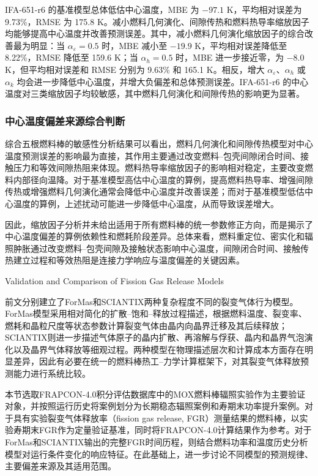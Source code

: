IFA-651-r6 的基准模型总体低估中心温度，MBE 为 \(-97.1\) K，平均相对误差为 9.73\%，RMSE 为 175.8 K。减小燃料几何演化、间隙传热和燃料热导率缩放因子均能够提高中心温度并改善预测误差。其中，减小燃料几何演化缩放因子的综合改善最为明显：当 \(\alpha_{\varepsilon}=0.5\) 时，MBE 减小至 \(-19.9\) K，平均相对误差降低至 8.22\%，RMSE 降低至 159.6 K；当 \(\alpha_h=0.5\) 时，MBE 进一步接近零，为 \(-8.0\) K，但平均相对误差和 RMSE 分别为 9.63\% 和 165.1 K。相反，增大 \(\alpha_{\varepsilon}\)、\(\alpha_h\) 或 \(\alpha_k\) 均会进一步降低中心温度，并增大负偏差和总体预测误差。IFA-651-r6 的中心温度对三类缩放因子均较敏感，其中燃料几何演化和间隙传热的影响更为显著。

\FloatBarrier
\subsubsection{中心温度偏差来源综合判断}

综合五根燃料棒的敏感性分析结果可以看出，燃料几何演化和间隙传热模型对中心温度预测误差的影响最为直接，其作用主要通过改变燃料--包壳间隙闭合时间、接触压力和等效间隙热阻来体现。燃料热导率缩放因子的影响相对稳定，主要改变燃料内部径向温降。对于基准模型高估中心温度的算例，提高燃料热导率、增强间隙传热或增强燃料几何演化通常会降低中心温度并改善误差；而对于基准模型低估中心温度的算例，上述扰动可能进一步降低中心温度，从而导致误差增大。

因此，缩放因子分析并未给出适用于所有燃料棒的统一参数修正方向，而是揭示了中心温度偏差的算例依赖性和燃耗阶段差异。总体来看，燃料重定位、密实化和辐照肿胀通过改变燃料--包壳间隙及接触状态影响中心温度，间隙闭合时间、接触传热建立过程和等效热阻是连接力学响应与温度偏差的关键因素。

\FloatBarrier
{}
{Validation and Comparison of Fission Gas Release Models}

前文分别建立了ForMas和SCIANTIX两种复杂程度不同的裂变气体行为模型。ForMas模型采用相对简化的扩散--饱和--释放过程描述，根据燃料温度、裂变率、燃耗和晶粒尺度等状态参数计算裂变气体由晶内向晶界迁移及其后续释放；SCIANTIX则进一步描述气体原子的晶内扩散、再溶解与俘获、晶内和晶界气泡演化以及晶界气体释放等细观过程。两种模型在物理描述层次和计算成本方面存在明显差异，因此有必要在统一的燃料棒热工--力学计算框架下，对其裂变气体释放预测能力进行系统比较。

本节选取FRAPCON-4.0积分评估数据库中的MOX燃料棒辐照实验作为主要验证对象，并按照运行历史将案例划分为长期稳态辐照案例和寿期末功率提升案例。对于具有实验裂变气体释放率（fission gas release, FGR）测量结果的燃料棒，以实验寿期末FGR作为定量验证基准，同时将FRAPCON-4.0计算结果作为参考。对于ForMas和SCIANTIX输出的完整FGR时间历程，则结合燃料功率和温度历史分析模型对运行条件变化的响应特征。在此基础上，进一步讨论不同模型的预测规律、主要偏差来源及其适用范围。

